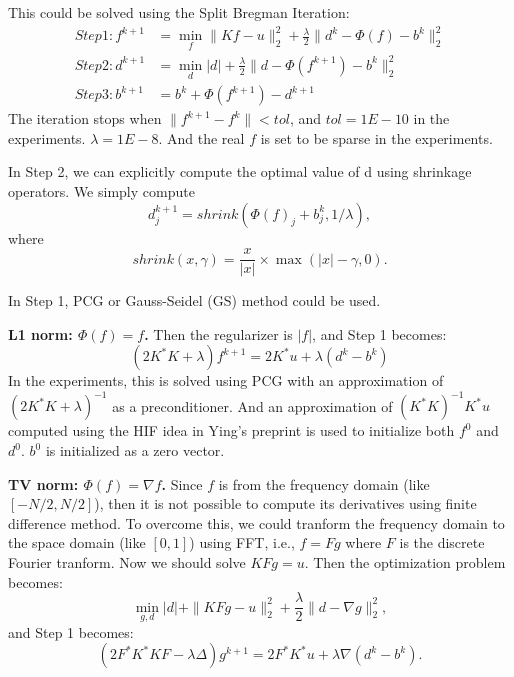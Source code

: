 \documentclass[11pt]{article}
\begin{document}
This could be solved using the Split Bregman Iteration:
\begin{equation}
\begin{aligned}
Step 1: f^{k+1} &= \min\limits_{f} \|Kf-u\|_{2}^{2} + \frac{\lambda}{2}\|d^{k}-\Phi(f)-b^{k}\|_{2}^2 \\
Step 2: d^{k+1} &= \min\limits_{d} |d| + \frac{\lambda}{2}\|d-\Phi(f^{k+1})-b^{k}\|_{2}^2 \\
Step 3: b^{k+1} &= b^{k} + \Phi(f^{k+1}) - d^{k+1}
\end{aligned}
\end{equation}
The iteration stops when $\|f^{k+1}-f^{k}\| < tol$, and $tol = 1E-10$ in the experiments. $\lambda = 1E-8$. And the real $f$ is set to be sparse in the experiments. 

In Step 2, we can
explicitly compute the optimal value of d using shrinkage operators. We simply compute 
\begin{equation}
d_{j}^{k+1} = shrink(\Phi(f)_{j}+b_{j}^{k}, 1/\lambda),
\end{equation}
where 
\begin{equation}
shrink(x, \gamma) = \frac{x}{|x|}\times \max(|x|-\gamma,0).
\end{equation}

In Step 1, PCG or Gauss-Seidel (GS) method could be used. 

\textbf{ L1 norm: $\Phi(f) = f$.} Then the regularizer is $|f|$, and Step 1 becomes:
\begin{equation}
(2 K^* K + \lambda) f^{k+1} = 2 K^* u + \lambda(d^{k}-b^{k})
\end{equation}
In the experiments, this is solved using PCG with an approximation of $(2 K^* K + \lambda)^{-1}$ as a preconditioner. And an approximation of $(K^* K)^{-1}K^* u$ computed using the HIF idea in Ying's preprint is used to initialize both $f^{0}$ and $d^{0}$. $b^{0}$ is initialized as a zero vector.

\textbf{ TV norm: $\Phi(f) = \nabla f$.} Since $f$ is from the frequency domain (like $[-N/2, N/2]$), then it is not possible to compute its derivatives using finite difference method. To overcome this, we could tranform the frequency domain to the space domain (like $[0,1]$) using FFT, i.e., $f = F g$ where $F$ is the discrete Fourier tranform. Now we should solve $KFg = u$. Then the optimization problem becomes:
\begin{equation*}
\min\limits_{g,d} |d| + \|KFg-u\|_{2}^{2} + \frac{\lambda}{2}\|d - \nabla g\|_{2}^{2},
\end{equation*}
and Step 1 becomes:
\begin{equation}
(2 F^* K^* K F - \lambda \Delta) g^{k+1} = 2 F^* K^* u + \lambda \nabla (d^{k}-b^{k}).
\end{equation}
\end{document}
